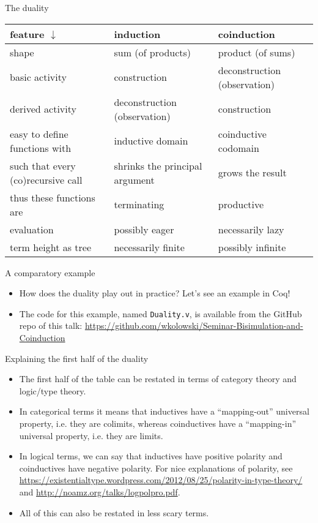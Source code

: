 \documentclass{beamer}
\begin{document}
\begin{frame}{The duality}
\begin{tabular}{ | p{3cm} | p{3cm} | p{3cm} | }
	\hline
	feature $\downarrow$ & induction & coinduction \\\hline
	shape & sum (of products) & product (of sums) \\\hline
	basic activity & construction & deconstruction (observation) \\\hline
	derived activity & deconstruction (observation) & construction \\\hline
	easy to define functions with & inductive domain & coinductive codomain \\\hline
	such that every (co)recursive call & shrinks the principal argument & grows the result \\\hline
	thus these functions are & terminating & productive \\\hline
	evaluation & possibly eager & necessarily lazy \\\hline
	term height as tree & necessarily finite & possibly infinite \\\hline
\end{tabular}
\end{frame}

\begin{frame}{A comparatory example}
\begin{itemize}
	\item How does the duality play out in practice? Let's see an example in Coq!
	\item The code for this example, named \texttt{Duality.v}, is available from the GitHub repo of this talk: \url{https://github.com/wkolowski/Seminar-Bisimulation-and-Coinduction}
\end{itemize}
\end{frame}

\begin{frame}{Explaining the first half of the duality}
\begin{itemize}
	\item The first half of the table can be restated in terms of category theory and logic/type theory.
	\item In categorical terms it means that inductives have a ``mapping-out'' universal property, i.e. they are colimits, whereas coinductives have a ``mapping-in'' universal property, i.e. they are limits.
	\item In logical terms, we can say that inductives have positive polarity and coinductives have negative polarity. For nice explanations of polarity, see \url{https://existentialtype.wordpress.com/2012/08/25/polarity-in-type-theory/} and \url{http://noamz.org/talks/logpolpro.pdf}.
	\item All of this can also be restated in less scary terms.
\end{itemize}
\end{frame}
\end{document}
